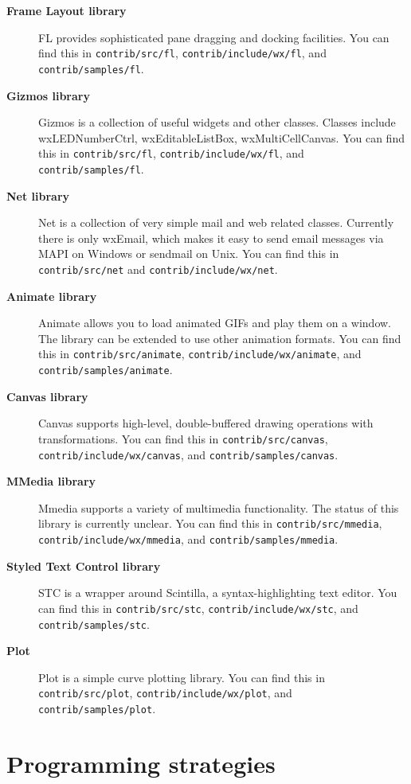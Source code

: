\begin{description}
\item[{\bf Frame Layout library}]
FL provides sophisticated pane dragging and docking facilities.
You can find this in {\tt contrib/src/fl}, {\tt contrib/include/wx/fl}, and {\tt contrib/samples/fl}.

\item[{\bf Gizmos library}]
Gizmos is a collection of useful widgets and other classes. Classes include wxLEDNumberCtrl,
wxEditableListBox, wxMultiCellCanvas.
You can find this in {\tt contrib/src/fl}, {\tt contrib/include/wx/fl}, and {\tt contrib/samples/fl}.

\item[{\bf Net library}]
Net is a collection of very simple mail and web related classes. Currently
there is only wxEmail, which makes it easy to send email messages via MAPI on Windows or sendmail on Unix.
You can find this in {\tt contrib/src/net} and {\tt contrib/include/wx/net}.

\item[{\bf Animate library}]
Animate allows you to load animated GIFs and play them on a window. The library can be extended
to use other animation formats.
You can find this in {\tt contrib/src/animate}, {\tt contrib/include/wx/animate}, and {\tt contrib/samples/animate}.

\item[{\bf Canvas library}]
Canvas supports high-level, double-buffered drawing operations with transformations.
You can find this in {\tt contrib/src/canvas}, {\tt contrib/include/wx/canvas}, and {\tt contrib/samples/canvas}.

\item[{\bf MMedia library}]
Mmedia supports a variety of multimedia functionality. The status of this library is currently unclear.
You can find this in {\tt contrib/src/mmedia}, {\tt contrib/include/wx/mmedia}, and {\tt contrib/samples/mmedia}.

\item[{\bf Styled Text Control library}]
STC is a wrapper around Scintilla, a syntax-highlighting text editor.
You can find this in {\tt contrib/src/stc}, {\tt contrib/include/wx/stc}, and {\tt contrib/samples/stc}.

\item[{\bf Plot}]
Plot is a simple curve plotting library.
You can find this in {\tt contrib/src/plot}, {\tt contrib/include/wx/plot}, and {\tt contrib/samples/plot}.
\end{description}

\chapter{Programming strategies}\label{strategies}
%
\setfooter{\thepage}{}{}{}{}{\thepage}%

